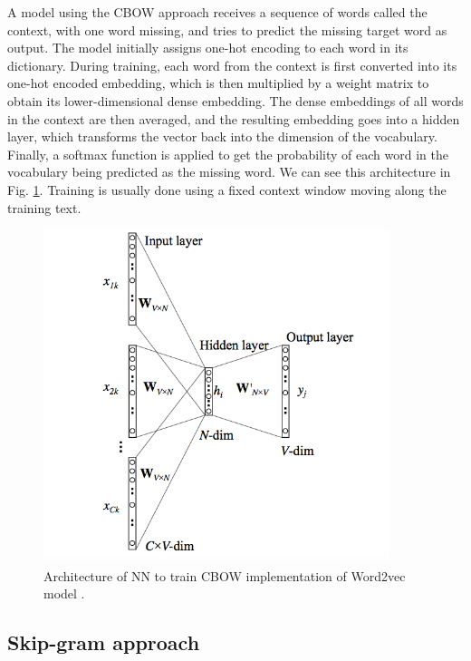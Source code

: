 A model using the CBOW approach receives a sequence of words called the context, with one word missing, and tries to predict the missing target word as output. The model initially assigns one-hot encoding to each word in its dictionary. During training, each word from the context is first converted into its one-hot encoded embedding, which is then multiplied by a weight matrix to obtain its lower-dimensional dense embedding. The dense embeddings of all words in the context are then averaged, and the resulting embedding goes into a hidden layer, which transforms the vector back into the dimension of the vocabulary. Finally, a softmax function is applied to get the probability of each word in the vocabulary being predicted as the missing word. We can see this architecture in Fig. \ref{fig:cbow_arch}. Training is usually done using a fixed context window moving along the training text.

\begin{figure}[!h]
	\centering
	
	\includegraphics[width=0.9\textwidth]{images/CBOW_arch.png}
	
	\caption{Architecture of NN to train CBOW implementation of Word2vec model \cite{cbow}.}
	\label{fig:cbow_arch}
\end{figure}

\subsection{Skip-gram approach}

